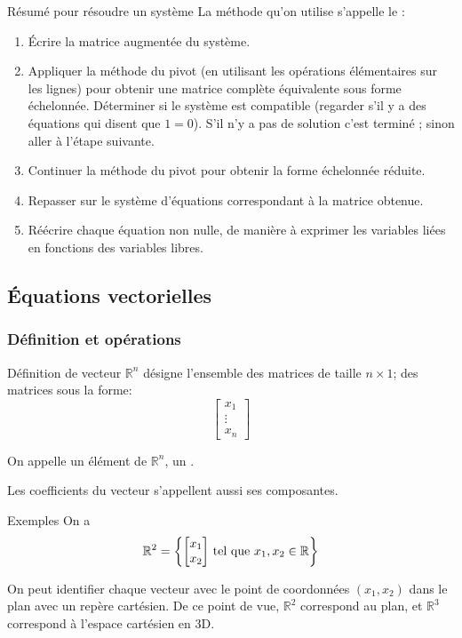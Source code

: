 \documentclass{article}
\begin{document}
\begin{parag}{Résumé pour résoudre un système}
    La méthode qu'on utilise s'appelle le :
    \begin{enumerate}
        \item Écrire la matrice augmentée du système.
        \item Appliquer la méthode du pivot (en utilisant les opérations élémentaires sur les lignes) pour obtenir une matrice complète équivalente sous forme échelonnée. Déterminer si le système est compatible (regarder s'il y a des équations qui disent que $1 = 0$). S'il n'y a pas de solution c'est terminé ; sinon aller à l'étape suivante.
        \item Continuer la méthode du pivot pour obtenir la forme échelonnée réduite.
        \item Repasser sur le système d'équations correspondant à la matrice obtenue.
        \item Réécrire chaque équation non nulle, de manière à exprimer les variables liées en fonctions des variables libres.
    \end{enumerate}

\end{parag}

\subsection{Équations vectorielles}
\subsubsection{Définition et opérations}

\begin{parag}{Définition de vecteur}
    $\mathbb{R}^n$ désigne l'ensemble des matrices de taille $n \times 1$; des matrices sous la forme:
    \[\begin{bmatrix} x_1 \\ \vdots \\ x_n \end{bmatrix} \]

    On appelle un élément de $\mathbb{R}^n$, un .

    Les coefficients du vecteur s'appellent aussi ses composantes.
\end{parag}

\begin{parag}{Exemples}
    On a
    \[\mathbb{R}^2 = \left\{\begin{bmatrix} x_1 \\ x_2 \end{bmatrix} \telque x_1, x_2 \in \mathbb{R} \right\}\]

    On peut identifier chaque vecteur avec le point de coordonnées $\left(x_1, x_2\right)$ dans le plan avec un repère cartésien. De ce point de vue, $\mathbb{R}^2$ correspond au plan, et $\mathbb{R}^3$ correspond à l'espace cartésien en 3D.
\end{parag}
\end{document}
